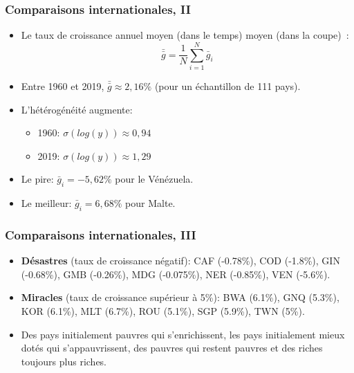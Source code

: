 \documentclass[10pt,notheorems]{beamer}
\theoremstyle{plain}
\theoremstyle{definition} %
\begin{document}
\begin{frame}
  \frametitle{Comparaisons internationales, II}

  \bigskip

  \begin{itemize}

  \item Le taux de croissance annuel moyen (dans le temps) moyen (dans la coupe)~:
    \[
      \bar{\bar g} = \frac{1}{N}\sum_{i=1}^{N} \bar g_{i}
    \]

  \item Entre 1960 et 2019, $\bar{\bar g} \approx 2,16\%$ (pour un échantillon de 111 pays).\newline

  \item L'hétérogénéité augmente:
    \begin{itemize}
    \item 1960: $\sigma (log(y)) \approx 0,94$
    \item 2019: $\sigma (log(y)) \approx 1,29$
    \end{itemize}

    \bigskip

  \item Le pire: $\bar g_{i} = -5,62\%$ pour le Vénézuela.\newline

  \item Le meilleur: $\bar g_{i} = 6,68\%$ pour Malte.\newline

  \end{itemize}

\end{frame}


\begin{frame}
  \frametitle{Comparaisons internationales, III}

  \bigskip

  \begin{itemize}

  \item \textbf{Désastres} (taux de croissance négatif): CAF (-0.78\%), COD (-1.8\%), GIN (-0.68\%), GMB (-0.26\%), MDG (-0.075\%), NER (-0.85\%), VEN (-5.6\%).\newline

  \item \textbf{Miracles} (taux de croissance supérieur à 5\%): BWA (6.1\%), GNQ (5.3\%), KOR (6.1\%), MLT (6.7\%), ROU (5.1\%), SGP (5.9\%), TWN (5\%).\newline

  \item Des pays initialement pauvres qui s'enrichissent, les pays initialement mieux dotés qui s'appauvrissent, des pauvres qui restent pauvres et des riches toujours plus riches.

  \end{itemize}

\end{frame}
\end{document}
